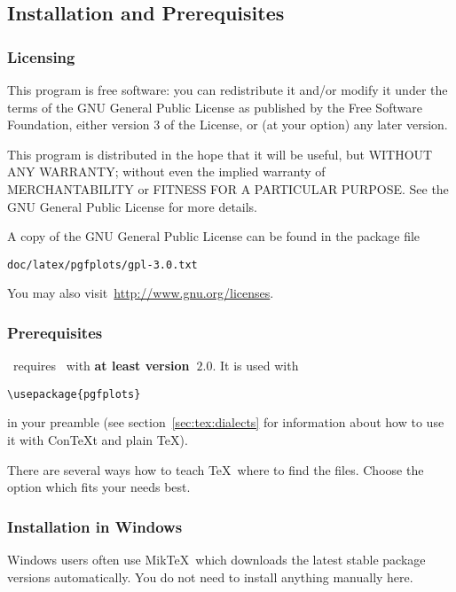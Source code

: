 
\subsection{Installation and Prerequisites}
\subsubsection{Licensing}
This program is free software: you can redistribute it and/or modify
it under the terms of the GNU General Public License as published by
the Free Software Foundation, either version 3 of the License, or
(at your option) any later version.

This program is distributed in the hope that it will be useful,
but WITHOUT ANY WARRANTY; without even the implied warranty of
MERCHANTABILITY or FITNESS FOR A PARTICULAR PURPOSE.  See the
GNU General Public License for more details.

A copy of the GNU General Public License can be found in the package file
\begin{verbatim}
doc/latex/pgfplots/gpl-3.0.txt
\end{verbatim}
You may also visit~\url{http://www.gnu.org/licenses}.

\subsubsection{Prerequisites}
\PGFPlots\ requires \PGF\ with \textbf{at least version~$2.0$}. It is used with
\begin{verbatim}
\usepackage{pgfplots}
\end{verbatim}
in your preamble (see section~\ref{sec:tex:dialects} for information about how to use it with Con{\TeX}t and plain \TeX).


There are several ways how to teach \TeX\ where to find the files. Choose the option which fits your needs best.

\subsubsection{Installation in Windows}
Windows users often use Mik\TeX\ which downloads the latest stable package versions automatically. You do not need to install anything manually here. 

